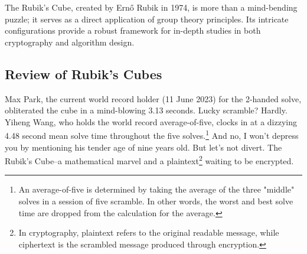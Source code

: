 \documentclass[12pt]{article}
\begin{document}
The Rubik's Cube, created by Ernő Rubik in 1974, is more than a mind-bending puzzle; it serves as a direct application of group theory principles. Its intricate configurations provide a robust framework for in-depth studies in both cryptography and algorithm design.

\subsection{Review of Rubik's Cubes}

Max Park, the current world record holder (11 June 2023) for the 2-handed solve, obliterated the cube in a mind-blowing 3.13 seconds. Lucky scramble? Hardly. Yiheng Wang, who holds the world record average-of-five, clocks in at a dizzying 4.48 second mean solve time throughout the five solves.\footnote{An average-of-five is determined by taking the average of the three "middle" solves in a session of five scramble. In other words, the worst and best solve time are dropped from the calculation for the average.} And no, I won't depress you by mentioning his tender age of nine years old. But let's not divert. The Rubik's Cube--a mathematical marvel and a plaintext\footnote{In cryptography, plaintext refers to the original readable message, while ciphertext is the scrambled message produced through encryption.} waiting to be encrypted. \\
\end{document}
